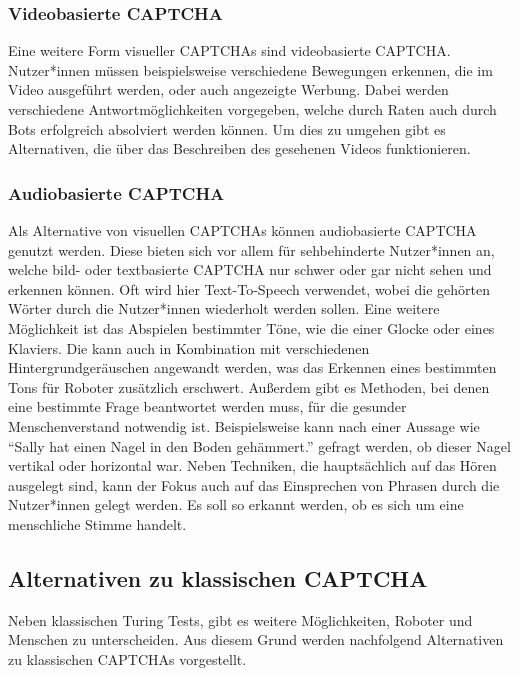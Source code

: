 \subsubsection*{Videobasierte CAPTCHA}
Eine weitere Form visueller CAPTCHAs sind videobasierte CAPTCHA. 
Nutzer*innen müssen beispielsweise verschiedene Bewegungen erkennen, die im Video ausgeführt werden,
oder auch angezeigte Werbung.
Dabei werden verschiedene Antwortmöglichkeiten vorgegeben, welche durch Raten auch durch Bots erfolgreich absolviert werden können.
Um dies zu umgehen gibt es Alternativen, die über das Beschreiben des gesehenen Videos funktionieren. \cite[p.xx]{surveyofresearch} 

\subsubsection*{Audiobasierte CAPTCHA}
Als Alternative von visuellen CAPTCHAs können audiobasierte CAPTCHA genutzt werden.
Diese bieten sich vor allem für sehbehinderte Nutzer*innen an, welche bild- oder textbasierte CAPTCHA nur schwer oder gar nicht sehen und erkennen können.
Oft wird hier Text-To-Speech verwendet, wobei die gehörten Wörter durch die Nutzer*innen wiederholt werden sollen.
Eine weitere Möglichkeit ist das Abspielen bestimmter Töne, wie die einer Glocke oder eines Klaviers. 
Die kann auch in Kombination mit verschiedenen Hintergrundgeräuschen angewandt werden, was das Erkennen eines bestimmten Tons für Roboter zusätzlich erschwert.
Außerdem gibt es Methoden, bei denen eine bestimmte Frage beantwortet werden muss, für die gesunder Menschenverstand notwendig ist. 
Beispielsweise kann nach einer Aussage wie ``Sally hat einen Nagel in den Boden gehämmert.'' gefragt werden, ob dieser Nagel vertikal oder horizontal war. \cite[p.3]{commonsense}
Neben Techniken, die hauptsächlich auf das Hören ausgelegt sind, kann der Fokus auch auf das Einsprechen von Phrasen durch die Nutzer*innen gelegt werden.
Es soll so erkannt werden, ob es sich um eine menschliche Stimme handelt.
\cite[p.78]{surveyofresearch}

\subsection{Alternativen zu klassischen CAPTCHA}
Neben klassischen Turing Tests, gibt es weitere Möglichkeiten, Roboter und Menschen zu unterscheiden.
Aus diesem Grund werden nachfolgend Alternativen zu klassischen CAPTCHAs vorgestellt.

